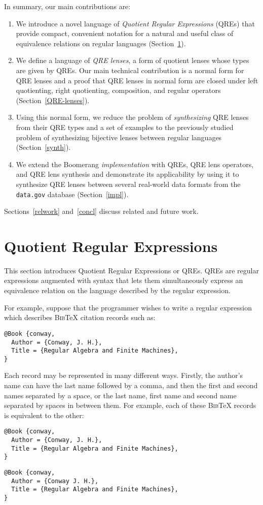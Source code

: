 \documentclass{svproc}
\newcommand{\bibtex}{\textsc{Bib}\TeX{}}
\begin{document}
In summary, our main contributions are:
\begin{enumerate}
\item We introduce a novel language of {\em Quotient Regular Expressions}
(QREs) that provide compact, convenient notation for a natural and useful
class of equivalence relations on regular languages (Section~\ref{QRE}).
\item We define a language of {\em QRE lenses}, a form of quotient lenses
whose types are given by QREs.  Our main technical contribution is a normal
form for QRE lenses and a proof that QRE lenses in normal form are closed
under left quotienting, right quotienting, composition, and regular
operators (Section~\ref{QRE-lenses}).
\item Using this normal form, we reduce the problem of {\em synthesizing}
  QRE lenses from their QRE types and a set of examples to the previously studied
  problem of synthesizing bijective lenses between regular languages 
  (Section~\ref{synth}).
\item We extend the Boomerang {\em implementation} with QREs, QRE lens operators,
  and QRE lens synthesis and demonstrate its applicability by using it to
  synthesize QRE lenses between several real-world data formats from the
  {\tt data.gov} database (Section~\ref{impl}).
\end{enumerate}
Sections~\ref{relwork} and~\ref{concl} discuss related and future work.

\section{Quotient Regular Expressions}
\label{QRE}

This section introduces Quotient Regular Expressions or QREs. QREs are regular
expressions augmented with syntax that lets them simultaneously express an
equivalence relation on the language described by the regular expression.

For example, suppose that the programmer wishes to write a regular expression
which describes \bibtex{} citation records such as:
\begin{verbatim}
@Book {conway,
  Author = {Conway, J. H.},
  Title = {Regular Algebra and Finite Machines},
}
\end{verbatim}

Each record may be represented in many different ways. Firstly, the author's
name can have the last name followed by a comma, and then the
first and second names separated by a space, or the last name, first name and
second name separated by spaces in between them. For example, each of these
\bibtex{} records is equivalent to the other:
\begin{verbatim}
@Book {conway,
  Author = {Conway, J. H.},
  Title = {Regular Algebra and Finite Machines},
}
\end{verbatim}
\begin{verbatim}
@Book {conway,
  Author = {Conway J. H.},
  Title = {Regular Algebra and Finite Machines},
}
\end{verbatim}
\end{document}
